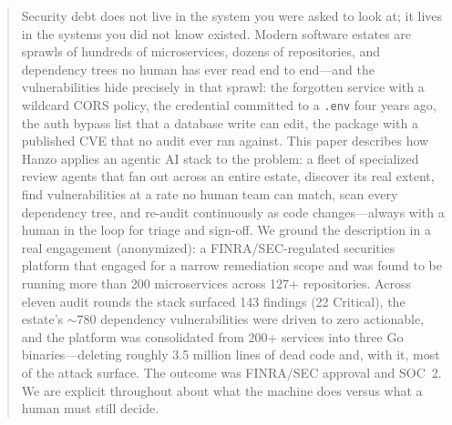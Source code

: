 \documentclass[11pt,letterpaper]{article}
\begin{document}
\makecover

\begin{abstract}
Security debt does not live in the system you were asked to look at; it lives in
the systems you did not know existed. Modern software estates are sprawls of
hundreds of microservices, dozens of repositories, and dependency trees no human
has ever read end to end---and the vulnerabilities hide precisely in that sprawl:
the forgotten service with a wildcard CORS policy, the credential committed to a
\texttt{.env} four years ago, the auth bypass list that a database write can
edit, the package with a published CVE that no audit ever ran against. This paper
describes how Hanzo applies an agentic AI stack to the problem: a fleet of
specialized review agents that fan out across an entire estate, discover its real
extent, find vulnerabilities at a rate no human team can match, scan every
dependency tree, and re-audit continuously as code changes---always with a human
in the loop for triage and sign-off. We ground the description in a real
engagement (anonymized): a FINRA/SEC-regulated securities platform that engaged
for a narrow remediation scope and was found to be running more than 200
microservices across 127+ repositories. Across eleven audit rounds the stack
surfaced 143 findings (22 Critical), the estate's $\sim$780 dependency
vulnerabilities were driven to zero actionable, and the platform was consolidated
from 200+ services into three Go binaries---deleting roughly 3.5 million lines of
dead code and, with it, most of the attack surface. The outcome was FINRA/SEC
approval and SOC~2. We are explicit throughout about what the machine does versus
what a human must still decide.
\end{abstract}
\end{document}
